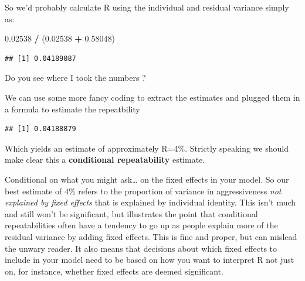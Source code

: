\documentclass[
  12pt,
]{book}
\makeatletter
\newenvironment{Shaded}{\begin{snugshade}}{\end{snugshade}}
\newcommand{\DecValTok}[1]{\textcolor[rgb]{0.00,0.00,0.81}{#1}}
\newcommand{\FloatTok}[1]{\textcolor[rgb]{0.00,0.00,0.81}{#1}}
\newcommand{\KeywordTok}[1]{\textcolor[rgb]{0.13,0.29,0.53}{\textbf{#1}}}
\newcommand{\NormalTok}[1]{#1}
\newcommand{\OperatorTok}[1]{\textcolor[rgb]{0.81,0.36,0.00}{\textbf{#1}}}
\newcommand{\StringTok}[1]{\textcolor[rgb]{0.31,0.60,0.02}{#1}}
\newenvironment{kframe}{%
\medskip{}
\setlength{\fboxsep}{.8em}
\def\at@end@of@kframe{}%
\ifinner\ifhmode%
 \def\at@end@of@kframe{\end{minipage}}%
 \begin{minipage}{\columnwidth}%
\fi\fi%
\def\FrameCommand##1{\hskip\@totalleftmargin \hskip-\fboxsep
\colorbox{incolor}{##1}\hskip-\fboxsep
    \hskip-\linewidth \hskip-\@totalleftmargin \hskip\columnwidth}%
\MakeFramed {\advance\hsize-\width
  \@totalleftmargin\z@ \linewidth\hsize
  \@setminipage}}%
{\par\unskip\endMakeFramed%
\at@end@of@kframe}
\newenvironment{rmdblock}[1]
 {
 \begin{itemize}
 \renewcommand{\labelitemi}{
   \raisebox{-.7\height}[0pt][0pt]{
     {\setkeys{Gin}{width=3em,keepaspectratio}\texttt{[image: images/icons/\#1]}}
   }
 }
 \begin{kframe}
 \setlength{\fboxsep}{1em}
 \item
 }
 {
 \end{kframe}
 \end{itemize}
 }
\newenvironment{rmdcode}
  {\begin{rmdblock}{code}}
  {\end{rmdblock}}
\makeatother
\begin{document}
So we'd probably calculate R using the individual and residual variance simply as:

\begin{Shaded}
\begin{Highlighting}[]
\FloatTok{0.02538} \OperatorTok{/}\StringTok{ }\NormalTok{(}\FloatTok{0.02538} \OperatorTok{+}\StringTok{ }\FloatTok{0.58048}\NormalTok{)}
\end{Highlighting}
\end{Shaded}

\begin{verbatim}
## [1] 0.04189087
\end{verbatim}

\begin{rmdcode}
Do you see where I took the numbers ?
\end{rmdcode}

We can use some more fancy coding to extract the estimates and plugged them in a formula to estimate the repeatbility

\begin{Shaded}
\end{Shaded}

\begin{verbatim}
## [1] 0.04188879
\end{verbatim}

Which yields an estimate of approximately R=4\%. Strictly speaking we should make clear this a \textbf{conditional repeatability} estimate.

Conditional on what you might ask\ldots{} on the fixed effects in your model. So our best estimate of 4\% refers to the proportion of variance in aggressiveness \emph{not explained by fixed effects} that is explained by individual identity. This isn't much and still won't be significant, but illustrates the point that conditional repeatabilities often have a tendency to go up as people explain more of the residual variance by adding fixed effects. This is fine and proper, but can mislead the unwary reader.
It also means that decisions about which fixed effects to include in your model need to be based on how you want to interpret R not just on, for instance, whether fixed effects are deemed significant.
\end{document}
